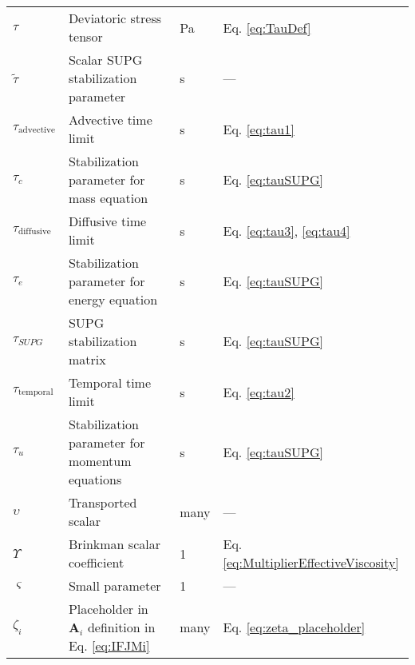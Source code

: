 \begin{longtable}{p{2cm}p{9cm}p{2cm}p{5cm}}
\(\tau\) & Deviatoric stress tensor & \si{\pascal} & Eq. \eqref{eq:TauDef}\\
\(\tilde{\tau}\) & Scalar SUPG stabilization parameter & \si{\second} & ---\\
\(\tau_\text{advective}\) & Advective time limit & \si{\second} & Eq. \eqref{eq:tau1}\\
\(\tau_c\) & Stabilization parameter for mass equation & \si{\second} & Eq. \eqref{eq:tauSUPG}\\
\(\tau_\text{diffusive}\) & Diffusive time limit & \si{\second} & Eq. \eqref{eq:tau3}, \eqref{eq:tau4}\\
\(\tau_e\) & Stabilization parameter for energy equation & \si{\second} & Eq. \eqref{eq:tauSUPG}\\
\(\tau_{SUPG}\) & SUPG stabilization matrix & \si{\second} & Eq. \eqref{eq:tauSUPG}\\
\(\tau_\text{temporal}\) & Temporal time limit & \si{\second} & Eq. \eqref{eq:tau2}\\
\(\tau_u\) & Stabilization parameter for momentum equations & \si{\second} & Eq. \eqref{eq:tauSUPG}\\
\(\upsilon\) & Transported scalar & many & ---\\
\(\Upsilon\) & Brinkman scalar coefficient & 1 & Eq. \eqref{eq:MultiplierEffectiveViscosity}\\
\(\varsigma\) & Small parameter & 1 & ---\\
\(\zeta_i\) & Placeholder in \(\textbf{A}_i\) definition in Eq. \eqref{eq:IFJMi} & many & Eq. \eqref{eq:zeta_placeholder}\\
\end{longtable}

